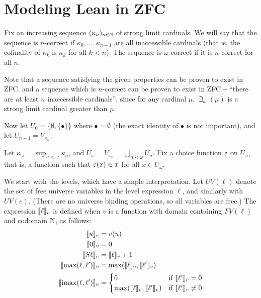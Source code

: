 \section{Modeling Lean in ZFC}\label{sec:soundness}
Fix an increasing sequence $(\kappa_n)_{n\in\mathbb{N}}$ of strong limit cardinals. We will say that the sequence is $n$-correct if $\kappa_0,\dots,\kappa_{n-1}$ are all inaccessible cardinals (that is, the cofinality of $\kappa_k$ is $\kappa_k$ for all $k<n$). The sequence is $\omega$-correct if it is $n$-correct for all $n$.

Note that a sequence satisfying the given properties can be proven to exist in ZFC, and a sequence which is $n$-correct can be proven to exist in ZFC${}+{}$``there are at least $n$ inaccessible cardinals'', since for any cardinal $\mu$, $\beth_\omega(\mu)$ is a strong limit cardinal greater than $\mu$.

Now let $U_0=\{\emptyset,\{\bullet\}\}$ where $\bullet=\emptyset$ (the exact identity of $\bullet$ is not important), and let $U_{n+1}=V_{\kappa_n}$.

Let $\kappa_\omega=\operatorname{sup}_{n<\omega}\kappa_n$, and $U_\omega=V_{\kappa_\omega}=\bigcup_{n<\omega} U_n$. Fix a choice function $\varepsilon$ on $U_\omega$, that is, a function such that $\varepsilon(x)\in x$ for all $x\in U_\omega$.

We start with the levels, which have a simple interpretation. Let $UV(\ell)$ denote the set of free universe variables in the level expression $\ell$, and similarly with $UV(e)$. (There are no universe binding operations, so all variables are free.) The expression $\llbracket \ell\rrbracket_v$ is defined when $v$ is a function with domain containing $FV(\ell)$ and codomain $\mathbb{N}$, as follows:
\begin{align*}
\llbracket u\rrbracket_v&=v(u)\\
\llbracket 0\rrbracket_v&=0\\
\llbracket S\ell\rrbracket_v&=\llbracket \ell\rrbracket_v+1\\
\llbracket \max(\ell,\ell')\rrbracket_v&=\max(\llbracket \ell\rrbracket_v,\llbracket \ell'\rrbracket_v)\\
\llbracket \operatorname{imax}(\ell,\ell')\rrbracket_v&=\begin{cases}
0&\mbox{if }\llbracket \ell'\rrbracket_v=0\\
\max(\llbracket \ell\rrbracket_v,\llbracket \ell'\rrbracket_v)&\mbox{if }\llbracket \ell'\rrbracket_v\ne 0
\end{cases}
\end{align*}

